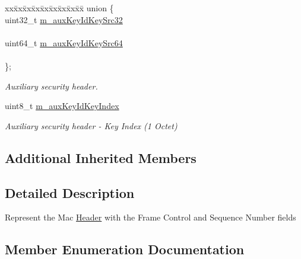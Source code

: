 \begin{DoxyCompactItemize}
\begin{tabbing}
xx\=xx\=xx\=xx\=xx\=xx\=xx\=xx\=xx\=\kill
union \{\\
\>uint32\_t \hyperlink{classns3_1_1LrWpanMacHeader_a17e5396fcce5becd6042872da64f7987}{m\_auxKeyIdKeySrc32}\\
\>\\
\>uint64\_t \hyperlink{classns3_1_1LrWpanMacHeader_a954dcb9d52a23143aaabae58e9858115}{m\_auxKeyIdKeySrc64}\\
\>\\
\}; \\

\end{tabbing}\begin{DoxyCompactList}\small\item\em Auxiliary security header. \end{DoxyCompactList}\item 
uint8\+\_\+t \hyperlink{classns3_1_1LrWpanMacHeader_ae072a1f74cf8ff7cb20ae7545e367f7c}{m\+\_\+aux\+Key\+Id\+Key\+Index}
\begin{DoxyCompactList}\small\item\em Auxiliary security header -\/ Key Index (1 Octet) \end{DoxyCompactList}\end{DoxyCompactItemize}
\subsection*{Additional Inherited Members}


\subsection{Detailed Description}
Represent the Mac \hyperlink{classns3_1_1Header}{Header} with the Frame Control and Sequence Number fields 

\subsection{Member Enumeration Documentation}
